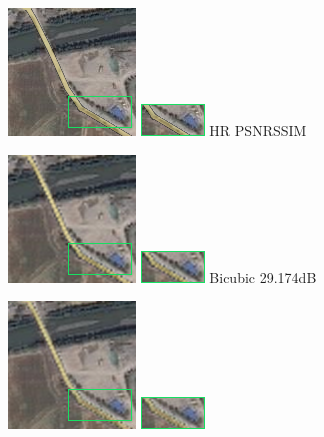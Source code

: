 \documentclass[runningheads,a4paper]{llncs}
\begin{document}
\begin{figure}[htbp]

    \begin{minipage}{1.3cm}
    \includegraphics[scale=0.4]{pic/2x/hr/518.png}
    \includegraphics[scale=0.8]{pic/2x/hr/small-518.png}
    {HR \linebreak PSNR\linebreak SSIM}
    \end{minipage}
    \qquad
    \begin{minipage}{1.4cm}
    \includegraphics[scale=0.4]{pic/2x/bicu/pick-518.png}
    \includegraphics[scale=0.8]{pic/2x/bicu/small-518.png}
    {Bicubic \linebreak 29.174dB}
    \end{minipage}
    \qquad
    \begin{minipage}{1.3cm}
     \includegraphics[scale=0.4]{pic/2x/srcnn/pick-518.png}
    \includegraphics[scale=0.8]{pic/2x/srcnn/small-518.png}

\end{minipage}
\end{figure}
\end{document}
